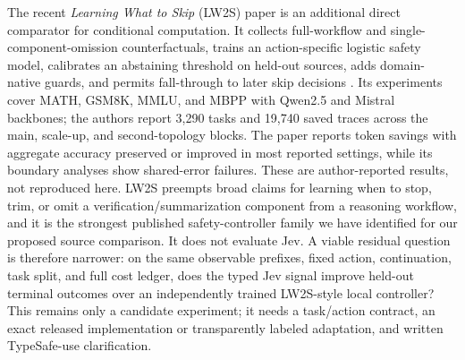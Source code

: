 \documentclass[11pt]{article}
\begin{document}
The recent \emph{Learning What to Skip} (LW2S) paper is an additional direct comparator for conditional computation. It collects full-workflow and single-component-omission counterfactuals, trains an action-specific logistic safety model, calibrates an abstaining threshold on held-out sources, adds domain-native guards, and permits fall-through to later skip decisions \cite{lw2s}. Its experiments cover MATH, GSM8K, MMLU, and MBPP with Qwen2.5 and Mistral backbones; the authors report 3,290 tasks and 19,740 saved traces across the main, scale-up, and second-topology blocks. The paper reports token savings with aggregate accuracy preserved or improved in most reported settings, while its boundary analyses show shared-error failures. These are author-reported results, not reproduced here. LW2S preempts broad claims for learning when to stop, trim, or omit a verification/summarization component from a reasoning workflow, and it is the strongest published safety-controller family we have identified for our proposed source comparison. It does not evaluate Jev. A viable residual question is therefore narrower: on the same observable prefixes, fixed action, continuation, task split, and full cost ledger, does the typed Jev signal improve held-out terminal outcomes over an independently trained LW2S-style local controller? This remains only a candidate experiment; it needs a task/action contract, an exact released implementation or transparently labeled adaptation, and written TypeSafe-use clarification.
\end{document}
